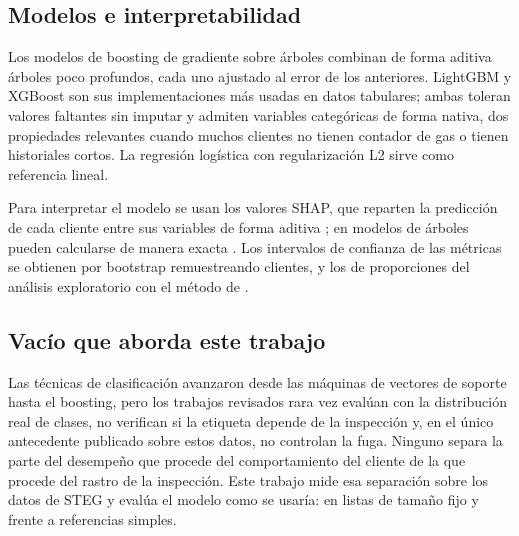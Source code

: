 \subsection{Modelos e interpretabilidad}

Los modelos de boosting de gradiente sobre árboles combinan de forma aditiva árboles poco
profundos, cada uno ajustado al error de los anteriores. LightGBM \parencite{ke2017} y XGBoost
\parencite{chen2016} son sus implementaciones más usadas en datos tabulares; ambas toleran
valores faltantes sin imputar y admiten variables categóricas de forma nativa, dos
propiedades relevantes cuando muchos clientes no tienen contador de gas o tienen historiales
cortos. La regresión logística con regularización L2 sirve como referencia lineal.

Para interpretar el modelo se usan los valores SHAP, que reparten la predicción de cada
cliente entre sus variables de forma aditiva \parencite{lundberg2017}; en modelos de árboles
pueden calcularse de manera exacta \parencite{lundberg2020}. Los intervalos de confianza de
las métricas se obtienen por bootstrap \parencite{efron1979} remuestreando clientes, y los de
proporciones del análisis exploratorio con el método de \textcite{wilson1927}.

\subsection{Vacío que aborda este trabajo}

Las técnicas de clasificación avanzaron desde las máquinas de vectores de soporte hasta el
boosting, pero los trabajos revisados rara vez evalúan con la distribución real de clases,
no verifican si la etiqueta depende de la inspección y, en el único antecedente publicado
sobre estos datos, no controlan la fuga. Ninguno separa la parte del desempeño que procede
del comportamiento del cliente de la que procede del rastro de la inspección. Este trabajo
mide esa separación sobre los datos de STEG y evalúa el modelo como se usaría: en listas de
tamaño fijo y frente a referencias simples.
